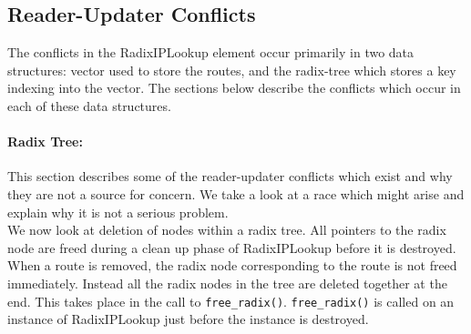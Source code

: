 \documentclass[a4paper,marginparwidth=50pt,marginparsep=10pt]{article}
\begin{document}
\subsection{Reader-Updater Conflicts}
The conflicts in the RadixIPLookup element occur primarily in two data structures: vector used to store the routes, and the radix-tree which stores a key indexing into the vector. The sections below describe the conflicts which occur in each of these data structures.
\paragraph{Radix Tree:}
This section describes some of the reader-updater conflicts which exist and why they are not a source for concern. We take a look at a race which might arise and explain why it is not a serious problem.\\

We now look at deletion of nodes within a radix tree. All pointers to the radix node are freed during a clean up phase of RadixIPLookup before it is destroyed. When a route is removed, the radix node corresponding to the route is not freed immediately. Instead all the radix nodes in the tree are deleted together at the end. This takes place in the call to \verb+free_radix()+. \verb+free_radix()+ is called on an instance of RadixIPLookup just before the instance is destroyed.\\
\end{document}
